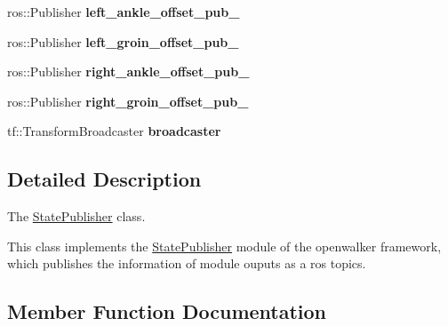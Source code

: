 \begin{DoxyCompactItemize}
\item 
ros\+::\+Publisher {\bfseries left\+\_\+ankle\+\_\+offset\+\_\+pub\+\_\+}\hypertarget{classow__pub_1_1StatePublisher_a089b7d97ff2d3660a8ddcc747121d10a}{}\label{classow__pub_1_1StatePublisher_a089b7d97ff2d3660a8ddcc747121d10a}

\item 
ros\+::\+Publisher {\bfseries left\+\_\+groin\+\_\+offset\+\_\+pub\+\_\+}\hypertarget{classow__pub_1_1StatePublisher_ad1e5f2851d0e9a68abc866ef58988210}{}\label{classow__pub_1_1StatePublisher_ad1e5f2851d0e9a68abc866ef58988210}

\item 
ros\+::\+Publisher {\bfseries right\+\_\+ankle\+\_\+offset\+\_\+pub\+\_\+}\hypertarget{classow__pub_1_1StatePublisher_afa96216f94a6c9b1d07ba9ebd4772643}{}\label{classow__pub_1_1StatePublisher_afa96216f94a6c9b1d07ba9ebd4772643}

\item 
ros\+::\+Publisher {\bfseries right\+\_\+groin\+\_\+offset\+\_\+pub\+\_\+}\hypertarget{classow__pub_1_1StatePublisher_a7082cd9ccc20d161004e7bc888e95df2}{}\label{classow__pub_1_1StatePublisher_a7082cd9ccc20d161004e7bc888e95df2}

\item 
tf\+::\+Transform\+Broadcaster {\bfseries broadcaster}\hypertarget{classow__pub_1_1StatePublisher_a32083e94f76c9f1ccd17610f14abd720}{}\label{classow__pub_1_1StatePublisher_a32083e94f76c9f1ccd17610f14abd720}

\end{DoxyCompactItemize}


\subsection{Detailed Description}
The \hyperlink{classow__pub_1_1StatePublisher}{State\+Publisher} class. 

This class implements the \hyperlink{classow__pub_1_1StatePublisher}{State\+Publisher} module of the openwalker framework, which publishes the information of module ouputs as a ros topics. 

\subsection{Member Function Documentation}
